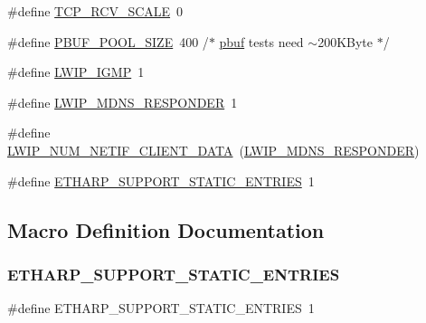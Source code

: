 \begin{DoxyCompactItemize}
\item 
\#define \hyperlink{openmote-cc2538_2lwip_2test_2unit_2lwipopts_8h_a768765a2c678fefeca6c89aae0cf629f}{T\+C\+P\+\_\+\+R\+C\+V\+\_\+\+S\+C\+A\+LE}~0
\item 
\#define \hyperlink{openmote-cc2538_2lwip_2test_2unit_2lwipopts_8h_a50eaadc4cad0716410332691e382c38a}{P\+B\+U\+F\+\_\+\+P\+O\+O\+L\+\_\+\+S\+I\+ZE}~400 /$\ast$ \hyperlink{structpbuf}{pbuf} tests need $\sim$200\+K\+Byte $\ast$/
\item 
\#define \hyperlink{openmote-cc2538_2lwip_2test_2unit_2lwipopts_8h_adaf25915ae1fd69c0943ef68cbb38923}{L\+W\+I\+P\+\_\+\+I\+G\+MP}~1
\item 
\#define \hyperlink{openmote-cc2538_2lwip_2test_2unit_2lwipopts_8h_ac94cc7a48fb5352f49a9e00594e89ea8}{L\+W\+I\+P\+\_\+\+M\+D\+N\+S\+\_\+\+R\+E\+S\+P\+O\+N\+D\+ER}~1
\item 
\#define \hyperlink{openmote-cc2538_2lwip_2test_2unit_2lwipopts_8h_a94a35212616f9a9aae5c98741612b936}{L\+W\+I\+P\+\_\+\+N\+U\+M\+\_\+\+N\+E\+T\+I\+F\+\_\+\+C\+L\+I\+E\+N\+T\+\_\+\+D\+A\+TA}~(\hyperlink{openmote-cc2538_2lwip_2test_2unit_2lwipopts_8h_ac94cc7a48fb5352f49a9e00594e89ea8}{L\+W\+I\+P\+\_\+\+M\+D\+N\+S\+\_\+\+R\+E\+S\+P\+O\+N\+D\+ER})
\item 
\#define \hyperlink{openmote-cc2538_2lwip_2test_2unit_2lwipopts_8h_a4675829464156f3d665f4de171c212d7}{E\+T\+H\+A\+R\+P\+\_\+\+S\+U\+P\+P\+O\+R\+T\+\_\+\+S\+T\+A\+T\+I\+C\+\_\+\+E\+N\+T\+R\+I\+ES}~1
\end{DoxyCompactItemize}


\subsection{Macro Definition Documentation}
\mbox{\label{openmote-cc2538_2lwip_2test_2unit_2lwipopts_8h_a4675829464156f3d665f4de171c212d7}} 
\subsubsection{\texorpdfstring{E\+T\+H\+A\+R\+P\+\_\+\+S\+U\+P\+P\+O\+R\+T\+\_\+\+S\+T\+A\+T\+I\+C\+\_\+\+E\+N\+T\+R\+I\+ES}{ETHARP\_SUPPORT\_STATIC\_ENTRIES}}
{\footnotesize\ttfamily \#define E\+T\+H\+A\+R\+P\+\_\+\+S\+U\+P\+P\+O\+R\+T\+\_\+\+S\+T\+A\+T\+I\+C\+\_\+\+E\+N\+T\+R\+I\+ES~1}

